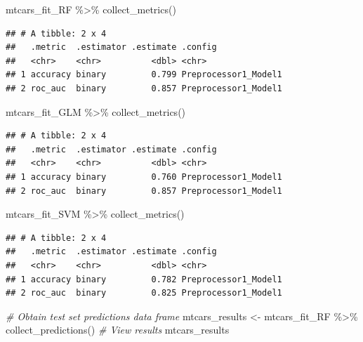 \documentclass[
]{book}
\newenvironment{Shaded}{\begin{snugshade}}{\end{snugshade}}
\newcommand{\CommentTok}[1]{\textcolor[rgb]{0.56,0.35,0.01}{\textit{#1}}}
\newcommand{\FunctionTok}[1]{\textcolor[rgb]{0.00,0.00,0.00}{#1}}
\newcommand{\NormalTok}[1]{#1}
\newcommand{\OtherTok}[1]{\textcolor[rgb]{0.56,0.35,0.01}{#1}}
\newcommand{\SpecialCharTok}[1]{\textcolor[rgb]{0.00,0.00,0.00}{#1}}
\begin{document}
\begin{Shaded}
\begin{Highlighting}[]
\NormalTok{mtcars\_fit\_RF }\SpecialCharTok{\%\textgreater{}\%} \FunctionTok{collect\_metrics}\NormalTok{()}
\end{Highlighting}
\end{Shaded}

\begin{verbatim}
## # A tibble: 2 x 4
##   .metric  .estimator .estimate .config             
##   <chr>    <chr>          <dbl> <chr>               
## 1 accuracy binary         0.799 Preprocessor1_Model1
## 2 roc_auc  binary         0.857 Preprocessor1_Model1
\end{verbatim}

\begin{Shaded}
\begin{Highlighting}[]
\NormalTok{mtcars\_fit\_GLM }\SpecialCharTok{\%\textgreater{}\%} \FunctionTok{collect\_metrics}\NormalTok{()}
\end{Highlighting}
\end{Shaded}

\begin{verbatim}
## # A tibble: 2 x 4
##   .metric  .estimator .estimate .config             
##   <chr>    <chr>          <dbl> <chr>               
## 1 accuracy binary         0.760 Preprocessor1_Model1
## 2 roc_auc  binary         0.857 Preprocessor1_Model1
\end{verbatim}

\begin{Shaded}
\begin{Highlighting}[]
\NormalTok{mtcars\_fit\_SVM }\SpecialCharTok{\%\textgreater{}\%} \FunctionTok{collect\_metrics}\NormalTok{()}
\end{Highlighting}
\end{Shaded}

\begin{verbatim}
## # A tibble: 2 x 4
##   .metric  .estimator .estimate .config             
##   <chr>    <chr>          <dbl> <chr>               
## 1 accuracy binary         0.782 Preprocessor1_Model1
## 2 roc_auc  binary         0.825 Preprocessor1_Model1
\end{verbatim}

\begin{Shaded}
\begin{Highlighting}[]
\CommentTok{\# Obtain test set predictions data frame}
\NormalTok{mtcars\_results }\OtherTok{\textless{}{-}}\NormalTok{ mtcars\_fit\_RF }\SpecialCharTok{\%\textgreater{}\%} 
                 \FunctionTok{collect\_predictions}\NormalTok{()}
\CommentTok{\# View results}
\NormalTok{mtcars\_results}
\end{Highlighting}
\end{Shaded}
\end{document}
